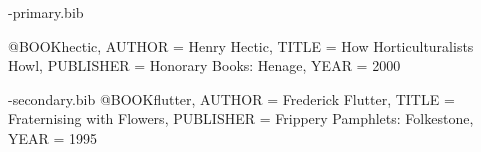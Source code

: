 \begin{filecontents}{\jobname-primary.bib}

@BOOK{hectic,
AUTHOR    = {Henry Hectic},
TITLE     = {How Horticulturalists Howl},
  PUBLISHER = {Honorary Books: Henage},
    YEAR      = {2000}
}
\end{filecontents}
\begin{filecontents}{\jobname-secondary.bib}
@BOOK{flutter,
      AUTHOR    = {Frederick Flutter},
        TITLE     = {Fraternising with Flowers},
          PUBLISHER = {Frippery Pamphlets: Folkestone},
            YEAR      = {1995}
        }
    \end{filecontents}
    \documentclass{article}
    \usepackage[utf8]{inputenc}
    \usepackage[backend=biber,style=authoryear]{biblatex}
    \usepackage{csquotes}
    
    

    
    Some citations: \cite{hectic}, \cite{flutter}.
    \printbibliography[title=Primary Sources, keyword=primary]
    \printbibliography[title=Secondary Sources, keyword=secondary]
    
